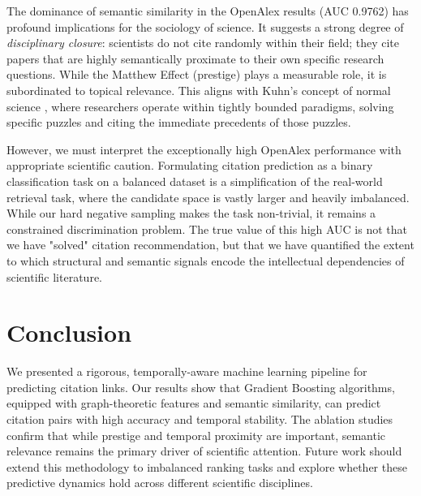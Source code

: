\documentclass[11pt,a4paper]{article}
\begin{document}
The dominance of semantic similarity in the OpenAlex results (AUC 0.9762) has profound implications for the sociology of science. It suggests a strong degree of \textit{disciplinary closure}: scientists do not cite randomly within their field; they cite papers that are highly semantically proximate to their own specific research questions. While the Matthew Effect (prestige) plays a measurable role, it is subordinated to topical relevance. This aligns with Kuhn's concept of normal science \cite{kuhn1962structure}, where researchers operate within tightly bounded paradigms, solving specific puzzles and citing the immediate precedents of those puzzles.

However, we must interpret the exceptionally high OpenAlex performance with appropriate scientific caution. Formulating citation prediction as a binary classification task on a balanced dataset is a simplification of the real-world retrieval task, where the candidate space is vastly larger and heavily imbalanced. While our hard negative sampling makes the task non-trivial, it remains a constrained discrimination problem. The true value of this high AUC is not that we have "solved" citation recommendation, but that we have quantified the extent to which structural and semantic signals encode the intellectual dependencies of scientific literature.

\section{Conclusion}
We presented a rigorous, temporally-aware machine learning pipeline for predicting citation links. Our results show that Gradient Boosting algorithms, equipped with graph-theoretic features and semantic similarity, can predict citation pairs with high accuracy and temporal stability. The ablation studies confirm that while prestige and temporal proximity are important, semantic relevance remains the primary driver of scientific attention. Future work should extend this methodology to imbalanced ranking tasks and explore whether these predictive dynamics hold across different scientific disciplines.



\end{document}
